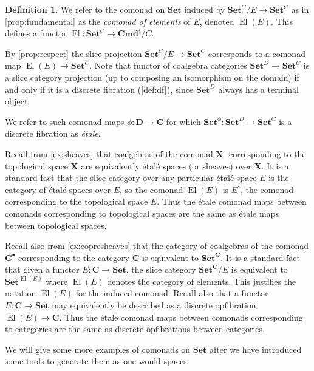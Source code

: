 \documentclass[11pt, oneside, article]{memoir}
\theoremstyle{plain}
\theoremstyle{definition}
\newtheorem{definition}[def]{Definition}
\theoremstyle{remark}
\newenvironment{example}
{\renewcommand\qedsymbol{$\lrcorner$}%
  \pushQED{\qed}\myexample}
{\popQED\endmyexample}
\DeclareMathOperator{\El}{El}
\newcommand{\namedcat}[1]{\mathbf{#1}}
\newcommand{\cat}[1]{\mathbf{#1}}
\newcommand{\spa}[1]{\mathbf{#1}}
\newcommand{\Set}{\namedcat{Set}}
\newcommand{\Com}{\namedcat{Cmd}^\sharp}
\newcommand{\ComSet}{\Com}
\newcommand{\CoalgOn}[2]{{#2}^{#1}}
\newcommand{\CoalgSet}[1]{\CoalgOn{#1}{\Set}}
\newcommand{\com}[2]{{#1}^{#2}}
\newcommand{\fun}[2]{{#2}^{#1}}
\newcommand{\cmnd}[1]{{#1}}
\newcommand{\eE}{E}
\newcommand{\cC}{\cmnd{C}}
\newcommand{\cD}{\cmnd{D}}
\newcommand{\bC}{\cat{C}}
\newcommand{\bD}{\cat{D}}
\newcommand{\tX}{\spa{X}}
\newcommand{\cX}{\toptocmd{\tX}}
\newcommand{\cbC}{\cattocmd{\bC}}
\newcommand{\CSet}{\CoalgSet{\cC}}
\newcommand{\DSet}{\CoalgSet{\cD}}
\newcommand{\cattocmd}[1]{{{#1}^\bullet}}
\newcommand{\toptocmd}[1]{{{#1}^\circ}}
\begin{document}
\begin{definition}\label{def:comonadofelements}\label{def:etale}
  We refer to the comonad on $\Set$ induced by $\CSet / \eE \to \CSet$ as in
  \cref{prop:fundamental} as the \emph{comonad of elements} of $\eE$,
  denoted $\El(\eE)$. This defines a functor
  $\El \colon \CSet \to \ComSet/\cC$.

  By \cref{prop:respect} the slice projection $\CSet / \eE \to \CSet$
  corresponds to a comonad map $\El(\eE) \to \CSet$. Note that functor
  of coalgebra categories $\DSet \to \CSet$ is a slice category
  projection (up to composing an isomorphism on the domain) if and
  only if it is a discrete fibration (\cref{def:df}), since $\DSet$
  always has a terminal object.

  We refer to such comonad maps $\phi \colon \bD \to \bC$ for which
  $\com{\Set}{\phi} \colon \DSet \to \CSet$ is a discrete fibration as
  \emph{\'etale}.
\end{definition}

\begin{example}\label{ex:dopf}
  Recall from \cref{ex:sheaves} that coalgebras of the comonad $\cX$
  corresponding to the topological space $\tX$ are equivalently
  \'etal\'e spaces (or sheaves) over $\tX$. It is a standard fact that
  the slice category over any particular \'etal\'e space $\eE$ is the
  category of \'etal\'e spaces over $\eE$, so the comonad $\El(\eE)$
  is $\toptocmd{\eE}$, the comonad corresponding to the topological
  space $\eE$. Thus the \'etale comonad maps between comonads
  corresponding to topological spaces are the same as \'etale maps
  between topological spaces.

  Recall also from \cref{ex:copresheaves} that the category of
  coalgebras of the comonad $\cbC$ corresponding to the
  category $\bC$ is equivalent to $\fun{\bC}{\Set}$. It is a standard
  fact that given a functor $\eE \colon \bC \to \Set$, the slice
  category $\fun{\bC}{\Set} / \eE$ is equivalent to
  $\fun{\El(\eE)}{\Set}$ where $\El(\eE)$ denotes the category of
  elements. This justifies the notation $\El(\eE)$ for the induced
  comonad. Recall also that a functor $\eE \colon \bC \to \Set$ may
  equivalently be described as a discrete opfibration
  $\El(\eE) \to \bC$. Thus the \'etale comonad maps between comonads
  corresponding to categories are the same as discrete opfibrations
  between categories.
\end{example}

We will give some more examples of comonads on $\Set$ after we have
introduced some tools to generate them as one would spaces.
\end{document}
